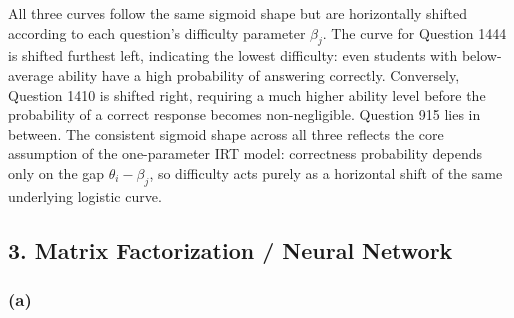 \documentclass[11pt, letterpaper]{article}
\begin{document}
All three curves follow the same sigmoid shape but are horizontally shifted according to each question's difficulty parameter $\beta_j$. The curve for Question 1444 is shifted furthest left, indicating the lowest difficulty: even students with below-average ability have a high probability of answering correctly. Conversely, Question 1410 is shifted right, requiring a much higher ability level before the probability of a correct response becomes non-negligible. Question 915 lies in between. The consistent sigmoid shape across all three reflects the core assumption of the one-parameter IRT model: correctness probability depends only on the gap $\theta_i - \beta_j$, so difficulty acts purely as a horizontal shift of the same underlying logistic curve.
 
\subsection*{3. Matrix Factorization / Neural Network}
\subsubsection*{(a)}
\end{document}
